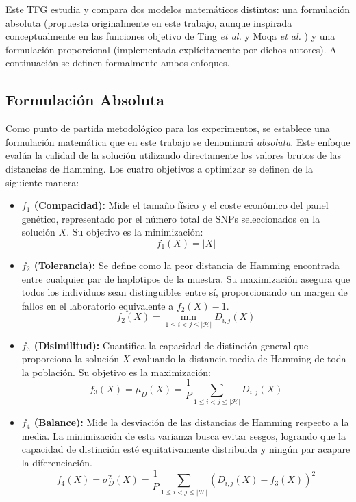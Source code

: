 Este TFG estudia y compara dos modelos matemáticos distintos: una formulación absoluta (propuesta originalmente en este trabajo, aunque inspirada conceptualmente en las funciones objetivo de Ting \textit{et al.} \cite{ting2010multi} y Moqa \textit{et al.} \cite{moqa2022assessing}) y una formulación proporcional (implementada explícitamente por dichos autores). A continuación se definen formalmente ambos enfoques.

\subsection{Formulación Absoluta}
Como punto de partida metodológico para los experimentos, se establece una formulación matemática que en este trabajo se denominará \textit{absoluta}. Este enfoque evalúa la calidad de la solución utilizando directamente los valores brutos de las distancias de Hamming. Los cuatro objetivos a optimizar se definen de la siguiente manera:

\begin{itemize}
    \item \textbf{$f_1$ (Compacidad):} Mide el tamaño físico y el coste económico del panel genético, representado por el número total de SNPs seleccionados en la solución $X$. Su objetivo es la minimización:
    \begin{equation}
        f_1(X) = |X|
    \end{equation}
    
    \item \textbf{$f_2$ (Tolerancia):} Se define como la peor distancia de Hamming encontrada entre cualquier par de haplotipos de la muestra. Su maximización asegura que todos los individuos sean distinguibles entre sí, proporcionando un margen de fallos en el laboratorio equivalente a $f_2(X) - 1$.
    \begin{equation}
        f_2(X) = \min_{1 \le i < j \le |\mathcal{H}|} D_{i,j}(X)
    \end{equation}
    
    \item \textbf{$f_3$ (Disimilitud):} Cuantifica la capacidad de distinción general que proporciona la solución $X$ evaluando la distancia media de Hamming de toda la población. Su objetivo es la maximización:
    \begin{equation}
        f_3(X) = \mu_{D}(X) = \frac{1}{P} \sum_{1 \le i < j \le |\mathcal{H}|} D_{i,j}(X)
    \end{equation}
    
    \item \textbf{$f_4$ (Balance):} Mide la desviación de las distancias de Hamming respecto a la media. La minimización de esta varianza busca evitar sesgos, logrando que la capacidad de distinción esté equitativamente distribuida y ningún par acapare la diferenciación.
    \begin{equation}
        f_4(X) = \sigma^2_{D}(X) = \frac{1}{P} \sum_{1 \le i < j \le |\mathcal{H}|} \left( D_{i,j}(X) - f_3(X) \right)^2
    \end{equation}
\end{itemize}

